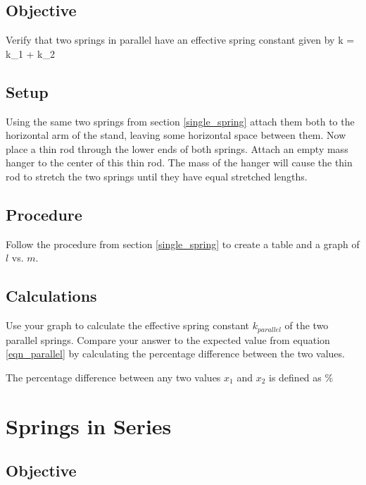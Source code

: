     \subsection*{Objective}

        Verify that two springs in parallel have an effective spring constant given by
        \beq \label{eqn_parallel}
            k = k_1 + k_2
        \eeq

    \subsection*{Setup}

        Using the same two springs from section \ref{single_spring} attach them both to the horizontal arm of the stand, leaving some horizontal space between them. Now place a thin rod through the lower ends of both springs. Attach an empty mass hanger to the center of this thin rod. The mass of the hanger will cause the thin rod to stretch the two springs until they have equal stretched lengths.

    \subsection*{Procedure}

        Follow the procedure from section \ref{single_spring} to create a table and a graph of $l$ vs. $m$.

    \subsection*{Calculations}

        Use your graph to calculate the effective spring constant $k_{parallel}$ of the two parallel springs. Compare your answer to the expected value from equation \eqref{eqn_parallel} by calculating the percentage difference between the two values.

        The percentage difference between any two values $x_1$ and $x_2$ is defined as
        \beq \label{percentage_difference}
              \%
        \eeq


\section{Springs in Series}

    \subsection*{Objective}


